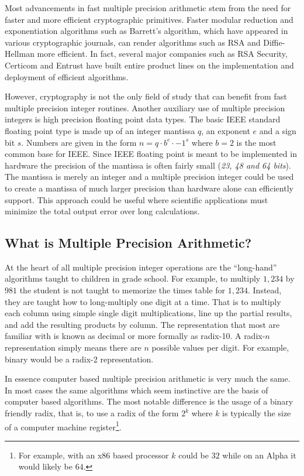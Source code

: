 \documentclass[b5paper]{book}
\begin{document}
Most advancements in fast multiple precision arithmetic stem from the need for faster and more efficient cryptographic 
primitives.  Faster modular reduction and exponentiation algorithms such as Barrett's algorithm, which have appeared in 
various cryptographic journals, can render algorithms such as RSA and Diffie-Hellman more efficient.  In fact, several 
major companies such as RSA Security, Certicom and Entrust have built entire product lines on the implementation and 
deployment of efficient algorithms.

However, cryptography is not the only field of study that can benefit from fast multiple precision integer routines.  
Another auxiliary use of multiple precision integers is high precision floating point data types.  
The basic IEEE \cite{IEEE} standard floating point type is made up of an integer mantissa $q$, an exponent $e$ and a sign bit $s$.  
Numbers are given in the form $n = q \cdot b^e \cdot -1^s$ where $b = 2$ is the most common base for IEEE.  Since IEEE 
floating point is meant to be implemented in hardware the precision of the mantissa is often fairly small 
(\textit{23, 48 and 64 bits}).  The mantissa is merely an integer and a multiple precision integer could be used to create
a mantissa of much larger precision than hardware alone can efficiently support.  This approach could be useful where 
scientific applications must minimize the total output error over long calculations.

\subsection{What is Multiple Precision Arithmetic?}
At the heart of all multiple precision integer operations are the ``long-hand'' algorithms taught to children in grade 
school.  For example, to multiply $1,234$ by $981$ the student is not taught to memorize the times table for 
$1,234$.  Instead, they are taught how to long-multiply one digit at a time.  That is to multiply each column using 
simple single digit multiplications, line up the partial results, and add the resulting products by column.  The 
representation that most are familiar with is known as decimal or more formally as radix-10. A radix-$n$ representation 
simply means there are $n$ possible values per digit.  For example, binary would be a radix-2 representation.

In essence computer based multiple precision arithmetic is very much the same.  In most cases the same algorithms
which seem instinctive are the basis of computer based algorithms.  The most notable difference is the usage
of a binary friendly radix, that is, to use a radix of the form $2^k$ where $k$ is typically the size of a computer 
machine register\footnote{For example, with an x86 based processor $k$ could be $32$ while on an Alpha it would likely
be $64$.}.
\end{document}
